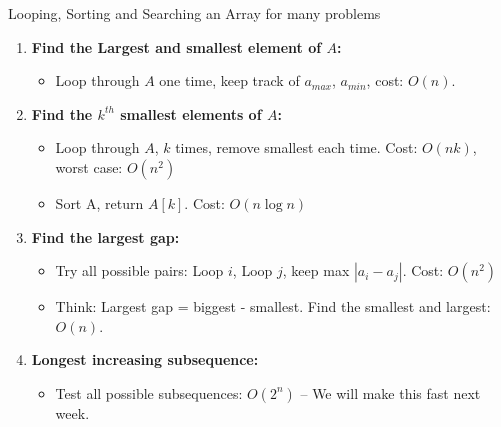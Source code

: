 \begin{frame}{Looping, Sorting and Searching an Array for many problems}

  \begin{enumerate}
  \item {\bf Find the Largest and smallest element of $A$:}
    \begin{itemize}
      \item Loop through $A$ one time, keep track of $a_{max}$, $a_{min}$, cost: $O(n)$.
    \end{itemize}
  \item {\bf Find the $k^{th}$ smallest elements of $A$:}
    \begin{itemize}
      \item Loop through $A$, $k$ times, remove smallest each time. Cost: $O(nk)$, worst case: $O(n^2)$
      \item Sort A, return $A[k]$. Cost: $O(n\log n)$
    \end{itemize}
  \item {\bf Find the largest gap:}
    \begin{itemize}
    \item Try all possible pairs: Loop $i$, Loop $j$, keep max $|a_i-a_j|$. Cost: $O(n^2)$
    \item Think: Largest gap = biggest - smallest. Find the smallest and largest: $O(n)$.
    \end{itemize}
  \item {\bf Longest increasing subsequence:}
    \begin{itemize}
    \item Test all possible subsequences: $O(2^n)$ -- We will make this fast next week.
    \end{itemize}
  \end{enumerate}
\end{frame}

%
%
